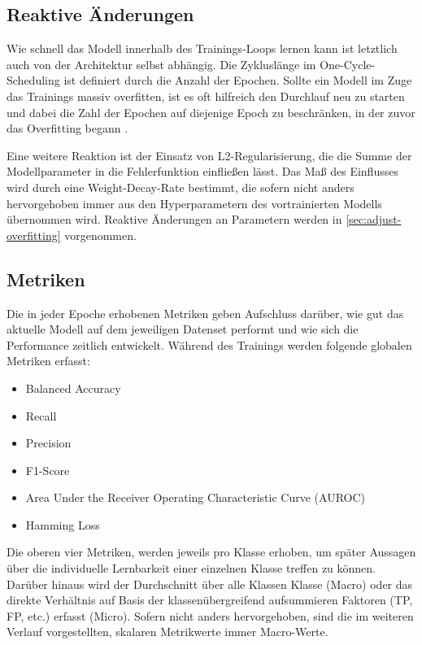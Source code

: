 \subsection{Reaktive Änderungen}
\label{subsec:reaktive-aenderungen}

Wie schnell das Modell innerhalb des Trainings-Loops lernen kann ist letztlich auch von der Architektur selbst abhängig.
Die Zykluslänge im One-Cycle-Scheduling ist definiert durch die Anzahl der Epochen.
Sollte ein Modell im Zuge das Trainings massiv overfitten, ist es oft hilfreich den Durchlauf neu zu starten und dabei die Zahl der Epochen auf diejenige Epoch zu beschränken, in der zuvor das Overfitting begann \cite{Gugger20}.

Eine weitere Reaktion ist der Einsatz von L2-Regularisierung, die die Summe der Modellparameter in die Fehlerfunktion einfließen lässt.
Das Maß des Einflusses wird durch eine Weight-Decay-Rate bestimmt, die sofern nicht anders hervorgehoben immer aus den Hyperparametern des vortrainierten Modells übernommen wird.
Reaktive Änderungen an Parametern werden in \autoref{sec:adjust-overfitting} vorgenommen.


\subsection{Metriken}
\label{subsec:metriken}

Die in jeder Epoche erhobenen Metriken geben Aufschluss darüber, wie gut das aktuelle Modell auf dem jeweiligen Datenset performt und wie sich die Performance zeitlich entwickelt.
Während des Trainings werden folgende globalen Metriken erfasst:

\begin{itemize}
    \item Balanced Accuracy
    \item Recall
    \item Precision%
    \item F1-Score
    \item Area Under the Receiver Operating Characteristic Curve (AUROC)
    \item Hamming Loss%
\end{itemize}

Die oberen vier Metriken, werden jeweils pro Klasse erhoben, um später Aussagen über die individuelle Lernbarkeit einer einzelnen Klasse treffen zu können.
Darüber hinaus wird der Durchschnitt über alle Klassen Klasse (Macro) oder das direkte Verhältnis auf Basis der klassenübergreifend aufsummieren Faktoren (TP, FP, etc.) erfasst (Micro).
Sofern nicht anders hervorgehoben, sind die im weiteren Verlauf vorgestellten, skalaren Metrikwerte immer Macro-Werte.

